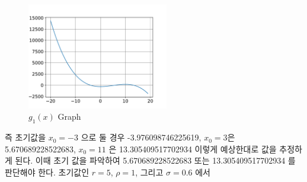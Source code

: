\documentclass[11pt]{article}
\begin{document}
\begin{figure}[!ht]
  \centering
  \includegraphics[width=0.55\textwidth]{Newton_Method3.pdf}
  \caption{$g_1(x)$ Graph}
\end{figure}

즉 초기값을 $x_0 = -3$ 으로 둘 경우 -3.976098746225619, $x_0 = 3$은 5.670689228522683, $x_0 = 11$ 은 13.305409517702934 이렇게 예상한대로 값을 추정하게 된다. 이때 초기 값을 파악하여 5.670689228522683 또는 13.305409517702934 를 판단해야 한다. 초기값인 $r = 5$, $\rho = 1$, 그리고 $\sigma = 0.6$ 에서
\end{document}
